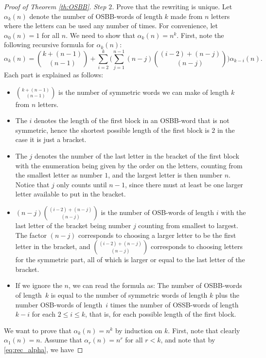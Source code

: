\documentclass[pdftex]{sigma}
\numberwithin{equation}{section}
\begin{document}
\begin{proof}[Proof of Theorem \ref{th:OSBB}]
 \textit{Step $2$.} Prove that the rewriting is unique. Let $\alpha_k(n)$ denote the number of OSBB-words of length $k$ made from $n$ letters where the letters can be used any number of times. For convenience, let $\alpha_0(n)=1$ for all $n$. We need to show that $\alpha_k(n) = n^k$. First, note the following recursive formula for $\alpha_k(n)$:
 \begin{equation}\label{eq:rec_alpha}
 \alpha_k(n) = \binom{k + (n-1)}{(n-1)} + \sum_{i=2}^k \Biggl( \sum_{j=1}^{n-1} (n-j) \binom{(i-2) + (n-j)}{(n-j)} \Biggr) \alpha_{k-i}(n).
 \end{equation}
 Each part is explained as follows:
 \begin{itemize}\itemsep=0pt
 \item $\binom{k + (n-1)}{(n-1)}$ is the number of symmetric words we can make of length $k$ from $n$ letters.
 \item The $i$ denotes the length of the first block in an OSBB-word that is not symmetric, hence the shortest possible length of the first block is $2$ in the case it is just a bracket.
 \item The $j$ denotes the number of the last letter in the bracket of the first block with the enumeration being given by the order on the letters, counting from the smallest letter as number $1$, and the largest letter is then number $n$. Notice that $j$ only counts until $n-1$, since there must at least be one larger letter available to put in the bracket.
 \item $(n-j) \binom{(i-2) + (n-j)}{(n-j)}$ is the number of OSB-words of length $i$ with the last letter of the bracket being number $j$ counting from smallest to largest. The factor $(n-j)$ corresponds to choosing a larger letter to be the first letter in the bracket, and $\binom{(i-2) + (n-j)}{(n-j)}$ corresponds to choosing letters for the symmetric part, all of which is larger or equal to the last letter of the bracket.
 \item If we ignore the $n$, we can read the formula as: The number of OSBB-words of length~$k$ is equal to the number of symmetric words of length $k$ plus the number OSB-words of length~$i$ times the number of OSSB-words of length $k-i$ for each $2\leq i \leq k$, that is, for each possible length of the first block.
 \end{itemize}
 We want to prove that $\alpha_k(n)=n^k$ by induction on $k$. First, note that clearly $\alpha_1(n) = n$. Assume that $\alpha_r(n)=n^r$ for all $r<k$, and note that by \eqref{eq:rec_alpha}, we have

\end{proof}
\end{document}

